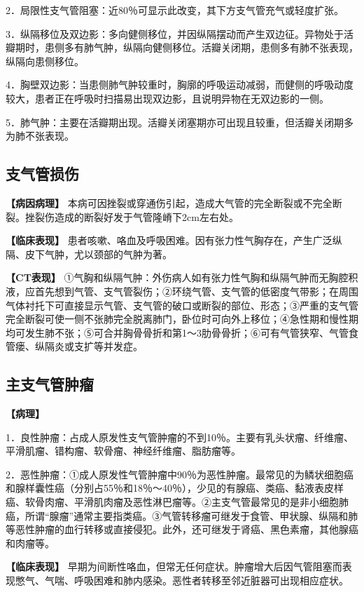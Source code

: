 2．局限性支气管阻塞：近80％可显示此改变，其下方支气管充气或轻度扩张。

3．纵隔移位及双边影：多向健侧移位，并因纵隔摆动而产生双边征。异物处于活瓣期时，患侧多有肺气肿，纵隔向健侧移位。活瓣关闭期，患侧多有肺不张表现，纵隔向患侧移位。

4．胸壁双边影：当患侧肺气肿较重时，胸廓的呼吸运动减弱，而健侧的呼吸动度较大，患者正在呼吸时扫描易出现双边影，且说明异物在无双边影的一侧。

5．肺气肿：主要在活瓣期出现。活瓣关闭塞期亦可出现且较重，但活瓣关闭期多为肺不张表现。

\subsection{支气管损伤}

\textbf{【病因病理】}
本病可因挫裂或穿通伤引起，造成大气管的完全断裂或不完全断裂。挫裂伤造成的断裂好发于气管隆嵴下2cm左右处。

\textbf{【临床表现】}
患者咳嗽、咯血及呼吸困难。因有张力性气胸存在，产生广泛纵隔、皮下气肿，尤以颈部的气肿为著。

\textbf{【CT表现】}
①气胸和纵隔气肿：外伤病人如有张力性气胸和纵隔气肿而无胸腔积液，应首先想到气管、支气管裂伤；②环绕气管、支气管的低密度气带影；在周围气体衬托下可直接显示气管、支气管的破口或断裂的部位、形态；③严重的支气管完全断裂可使一侧不张肺完全脱离肺门，卧位时可向外上移位；④急性期和慢性期均可发生肺不张；⑤可合并胸骨骨折和第1～3肋骨骨折；⑥可有气管狭窄、气管食管瘘、纵隔炎或支扩等并发症。

\subsection{主支气管肿瘤}

\textbf{【病理】}

1．良性肿瘤：占成人原发性支气管肿瘤的不到10％。主要有乳头状瘤、纤维瘤、平滑肌瘤、错构瘤、软骨瘤、神经纤维瘤、脂肪瘤等。

2．恶性肿瘤：①成人原发性气管肿瘤中90％为恶性肿瘤。最常见的为鳞状细胞癌和腺样囊性癌（分别占55％和18％～40％），少见的有腺癌、类癌、黏液表皮样癌、软骨肉瘤、平滑肌肉瘤及恶性淋巴瘤等。②主支气管最常见的是非小细胞肺癌，所谓“腺瘤”通常主要指类癌。③气管转移瘤可继发于食管、甲状腺、纵隔和肺等恶性肿瘤的血行转移或直接侵犯。此外，还可继发于肾癌、黑色素瘤，其他腺癌和肉瘤等。

\textbf{【临床表现】}
早期为间断性咯血，但常无任何症状。肿瘤增大后因气管阻塞而表现憋气、气喘、呼吸困难和肺内感染。恶性者转移至邻近脏器可出现相应症状。

